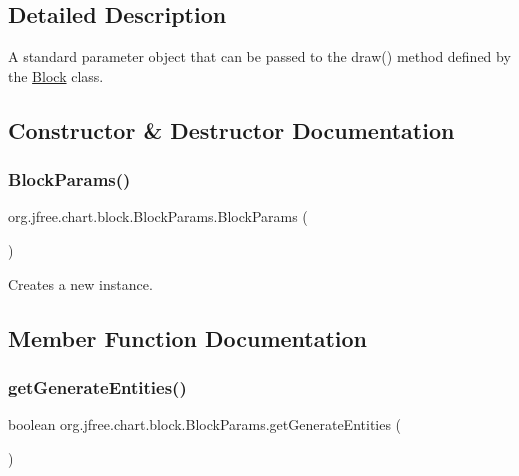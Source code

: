 \subsection{Detailed Description}
A standard parameter object that can be passed to the draw() method defined by the \mbox{\hyperlink{interfaceorg_1_1jfree_1_1chart_1_1block_1_1_block}{Block}} class. 

\subsection{Constructor \& Destructor Documentation}
\mbox{\label{classorg_1_1jfree_1_1chart_1_1block_1_1_block_params_a274dfbe74df7b75505cec4eb456b328c}} 
\subsubsection{\texorpdfstring{Block\+Params()}{BlockParams()}}
{\footnotesize\ttfamily org.\+jfree.\+chart.\+block.\+Block\+Params.\+Block\+Params (\begin{DoxyParamCaption}{ }\end{DoxyParamCaption})}

Creates a new instance. 

\subsection{Member Function Documentation}
\mbox{\label{classorg_1_1jfree_1_1chart_1_1block_1_1_block_params_a5e6834d032c280d81a98ce45f615d231}} 
\subsubsection{\texorpdfstring{get\+Generate\+Entities()}{getGenerateEntities()}}
{\footnotesize\ttfamily boolean org.\+jfree.\+chart.\+block.\+Block\+Params.\+get\+Generate\+Entities (\begin{DoxyParamCaption}{ }\end{DoxyParamCaption})}

